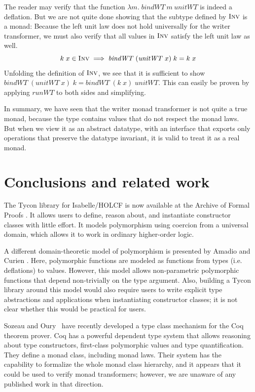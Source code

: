 \documentclass{sigplanconf}
\newcommand{\hsc}[1]{\ensuremath{\mathit{#1}}}
\newcommand{\INV}{\text{\textsc{Inv}}}
\theoremstyle{definition}
\begin{document}
The reader may verify that the function $\lambda{m}.\;\hsc{bindWT}\:m\:\hsc{unitWT}$ is indeed a deflation. But we are not quite done showing that the subtype defined by $\INV$ is a monad: Because the left unit law does not hold universally for the writer transformer, we must also verify that all values in $\INV$ satisfy the left unit law as well.
%
\begin{equation}
k\;x \in \INV \implies \hsc{bindWT}\;(\hsc{unitWT}\;x)\;k = k\;x
\end{equation}
%
Unfolding the definition of $\INV$, we see that it is sufficient to show $\hsc{bindWT}\;(\hsc{unitWT}\;x)\;k = \hsc{bindWT}\;(k\;x)\;\hsc{unitWT}$. This can easily be proven by applying \hsc{runWT} to both sides and simplifying.

In summary, we have seen that the writer monad transformer is not quite a true monad, because the type contains values that do not respect the monad laws. But when we view it as an abstract datatype, with an interface that exports only operations that preserve the datatype invariant, it is valid to treat it as a real monad.

\section{Conclusions and related work}
\label{sec:conclusion}

The Tycon library for Isabelle/HOLCF is now available at the Archive of Formal Proofs \cite{AFP2012}. It allows users to define, reason about, and instantiate constructor classes with little effort. It models polymorphism using coercion from a universal domain, which allows it to work in ordinary higher-order logic.

A different domain-theoretic model of polymorphism is presented by Amadio and Curien \cite{amadio+curien}. Here, polymorphic functions are modeled as functions from types (i.e. deflations) to values. However, this model allows non-parametric polymorphic functions that depend non-trivially on the type argument. Also, building a Tycon library around this model would also require users to write explicit type abstractions and applications when instantiating constructor classes; it is not clear whether this would be practical for users.

Sozeau and Oury~\cite{Sozeau2008} have recently developed a type class mechanism for the Coq theorem prover. Coq has a powerful dependent type system that allows reasoning about type constructors, first-class polymorphic values and type quantification. They define a monad class, including monad laws. Their system has the capability to formalize the whole monad class hierarchy, and it appears that it could be used to verify monad transformers; however, we are unaware of any published work in that direction.
\end{document}
